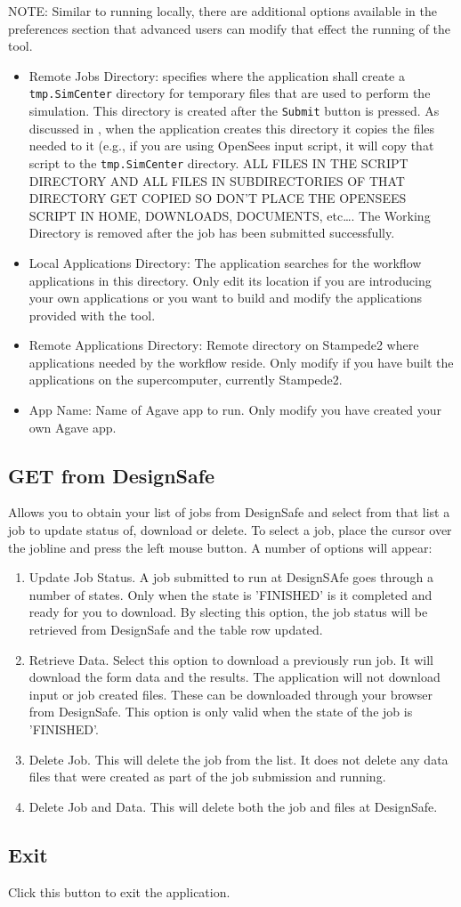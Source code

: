 NOTE: Similar to running locally, there are additional options available in the preferences
 section that advanced users can modify that effect the running of the tool.
\begin{itemize}
\item Remote Jobs Directory: specifies where the \texttt{\getsoftwarename{}} application shall
create a \texttt{tmp.SimCenter} directory for temporary files that are used to perform the simulation. This directory is created after the \texttt{Submit} button is pressed. As discussed in , when
the application creates this directory it copies the files needed to it (e.g., if you are using OpenSees input script, it
will copy that script to the \texttt{tmp.SimCenter} directory. ALL FILES IN
THE SCRIPT DIRECTORY AND ALL FILES IN SUBDIRECTORIES OF THAT DIRECTORY GET
COPIED SO DON’T PLACE THE OPENSEES SCRIPT IN HOME, DOWNLOADS, DOCUMENTS, etc…. The Working Directory is removed after the job has been submitted successfully.
\item Local Applications Directory: The \texttt{\getsoftwarename{}} application searches for the workflow applications in this directory. Only edit its location if you are introducing your own applications or you want to build and modify the 
applications provided with the tool. 
\item Remote Applications Directory: Remote directory on Stampede2 where applications needed by the workflow reside. Only modify if you have built the applications on the supercomputer, currently Stampede2.
\item App Name: Name of Agave app to run. Only modify you have created your own Agave app.
\end{itemize}

\subsection{GET from DesignSafe}
Allows you to obtain your list of jobs from DesignSafe and select from that list a job to update status of, download or delete. To select a job, place the cursor over the jobline and press the left mouse button. A number of options will appear:
\begin{enumerate}
\item Update Job Status. A job submitted to run at DesignSAfe goes through a number of states. Only when the state is 'FINISHED' is it completed and ready for you to download. By slecting this option, the job status will be retrieved from DesignSafe and the table row updated.
\item Retrieve Data. Select this option to download a previously run job. It will download the form data and the results. The application will not download input or job created files. These can be downloaded through your browser from DesignSafe. This option is only valid when the state of the job is 'FINISHED'.
\item Delete Job. This will delete the job from the list. It does not delete any data files that were created as part of the job submission and running.
\item Delete Job and Data. This will delete both the job and files at DesignSafe.
\end{enumerate}


\subsection{Exit}
Click this button to exit the application.
